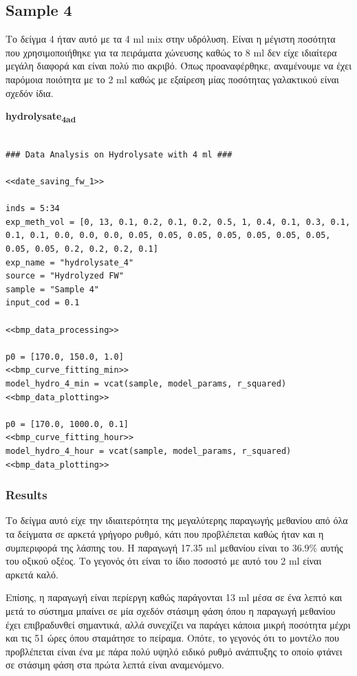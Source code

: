 \documentclass[11pt]{article}
\begin{document}
\subsection{Sample 4}
\label{sec:orga3e5af5}
Το δείγμα 4 ήταν αυτό με τα 4 ml mix στην υδρόλυση. Είναι η μέγιστη ποσότητα που χρησιμοποιήθηκε για τα πειράματα χώνευσης καθώς το 8 ml δεν είχε ιδιαίτερα μεγάλη διαφορά και είναι πολύ πιο ακριβό. Όπως προαναφέρθηκε, αναμένουμε να έχει παρόμοια ποιότητα με το 2 ml καθώς με εξαίρεση μίας ποσότητας γαλακτικού είναι σχεδόν ίδια.

\textbf{hydrolysate\textsubscript{4}\textsubscript{ad}}
\begin{verbatim}

### Data Analysis on Hydrolysate with 4 ml ###

<<date_saving_fw_1>>

inds = 5:34
exp_meth_vol = [0, 13, 0.1, 0.2, 0.1, 0.2, 0.5, 1, 0.4, 0.1, 0.3, 0.1, 0.1, 0.1, 0.0, 0.0, 0.0, 0.05, 0.05, 0.05, 0.05, 0.05, 0.05, 0.05, 0.05, 0.05, 0.2, 0.2, 0.2, 0.1]
exp_name = "hydrolysate_4"
source = "Hydrolyzed FW"
sample = "Sample 4"
input_cod = 0.1

<<bmp_data_processing>>

p0 = [170.0, 150.0, 1.0]
<<bmp_curve_fitting_min>>
model_hydro_4_min = vcat(sample, model_params, r_squared)
<<bmp_data_plotting>>

p0 = [170.0, 1000.0, 0.1]
<<bmp_curve_fitting_hour>>
model_hydro_4_hour = vcat(sample, model_params, r_squared)
<<bmp_data_plotting>>
\end{verbatim}

\subsubsection{Results}
\label{sec:orgdccd26e}
Το δείγμα αυτό είχε την ιδιαιτερότητα της μεγαλύτερης παραγωγής μεθανίου από όλα τα δείγματα σε αρκετά γρήγορο ρυθμό, κάτι που προβλέπεται καθώς ήταν και η συμπεριφορά της λάσπης του. Η παραγωγή 17.35 ml μεθανίου είναι το \(36.9 \%\) αυτής του οξικού οξέος. Το γεγονός ότι είναι το ίδιο ποσοστό με αυτό του 2 ml είναι αρκετά καλό.

Επίσης, η παραγωγή είναι περίεργη καθώς παράγονται 13 ml μέσα σε ένα λεπτό και μετά το σύστημα μπαίνει σε μία σχεδόν στάσιμη φάση όπου η παραγωγή μεθανίου έχει επιβραδυνθεί σημαντικά, αλλά συνεχίζει να παράγει κάποια μικρή ποσότητα μέχρι και τις 51 ώρες όπου σταμάτησε το πείραμα. Οπότε, το γεγονός ότι το μοντέλο που προβλέπεται είναι ένα με πάρα πολύ υψηλό ειδικό ρυθμό ανάπτυξης το οποίο φτάνει σε στάσιμη φάση στα πρώτα λεπτά είναι αναμενόμενο.
\end{document}
